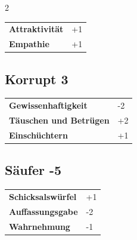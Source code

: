 \begin{multicols}{2}
\begin{tcolorbox}
\begin{tabular}{@{}ll@{}}
    \textbf{Attraktivität} & +1\\
    \textbf{Empathie} & +1\\
\end{tabular}


\end{tcolorbox}

\begin{tcolorbox}
    \subsection*{Korrupt \hfill \small{3 }}
    \tcblower




\begin{tabular}{@{}ll@{}}
    \textbf{Gewissenhaftigkeit} & -2\\
    \textbf{Täuschen und Betrügen} & +2\\
    \textbf{Einschüchtern} & +1\\
\end{tabular}


\end{tcolorbox}

\begin{tcolorbox}
    \subsection*{Säufer \hfill \small{-5 }}
    \tcblower




\begin{tabular}{@{}ll@{}}
    \textbf{Schicksalswürfel} & +1\\
    \textbf{Auffassungsgabe} & -2\\
    \textbf{Wahrnehmung} & -1\\
\end{tabular}



\end{tcolorbox}
\end{multicols}
